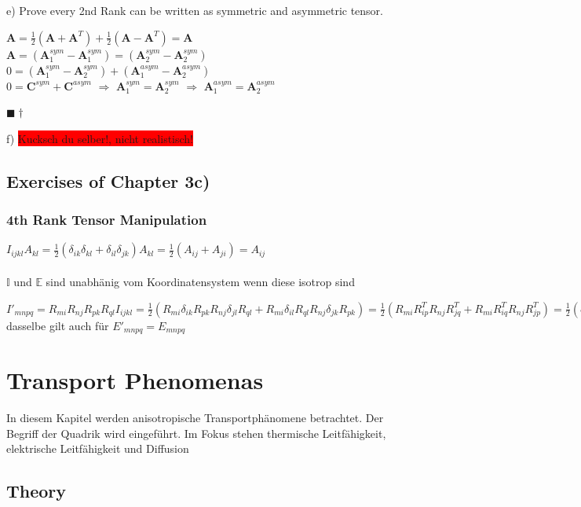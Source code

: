 \documentclass[a4paper]{scrartcl}
\newcommand{\qed}{\begin{flushright}
$\blacksquare \dagger$ \end{flushright}}
\begin{document}
e) Prove every 2nd Rank can be written as symmetric and asymmetric tensor.

$\mathbf{A}=\frac{1}{2}\left(\mathbf{A} + \mathbf{A}^T\right)+
\frac{1}{2}\left(\mathbf{A}-\mathbf{A}^T\right) = \mathbf{A}$ \\
$\mathbf{A}=\left(\mathbf{A}_1^{sym}-\mathbf{A}_1^{sym}\right)=\left(\mathbf{A}_2^{sym}-\mathbf{A}_2^{sym}\right)$
\\
$0=\left(\mathbf{A}_1^{sym}-\mathbf{A}_2^{sym}\right)+\left(\mathbf{A}_1^{asym}-\mathbf{A}_2^{asym}\right)$
\\
$0=\mathbf{C}^{sym}+\mathbf{C}^{asym}$ $\Rightarrow$
$\mathbf{A}_1^{sym}=\mathbf{A}_2^{sym}$ $\Rightarrow$
$\mathbf{A}_1^{asym}=\mathbf{A}_2^{asym}$ \qed


f) \colorbox{red}{Kucksch du selber!, nicht realistisch!}




\subsection{Exercises of Chapter 3c)}

\subsubsection{4th Rank Tensor Manipulation}


$I_{ijkl}A_{kl}=\frac{1}{2}(\delta_{ik}\delta_{kl}+\delta_{il}\delta_{jk})A_{kl}=\frac{1}{2}(A_{ij}+A_{ji})=A_{ij}$
\\
\\
$ \mathbb{I} $ und $ \mathbb{E} $ sind unabhänig vom Koordinatensystem wenn diese isotrop sind

$ I'_{mnpq}=R_{mi}R_{nj}R_{pk}R_{ql}I_{ijkl} = \frac{1}{2}(R_{mi}\delta_{ik}R_{pk}R_{nj}\delta_{jl}R_{ql} + R_{mi}\delta_{il}R_{ql}R_{nj}\delta_{jk}R_{pk})= \frac{1}{2}(R_{mi}R^T_{ip}R_{nj}R^T_{jq}+R_{mi}R^T_{iq}R_{nj}R^T_{jp})= \frac{1}{2}(\delta_{mp}\delta_{mq}\delta_{np})=I_{mnpq} $ dasselbe gilt auch für $ E'_{mnpq}=E_{mnpq}$



\section{Transport Phenomenas}
In diesem Kapitel werden anisotropische Transportphänomene betrachtet. Der
Begriff der Quadrik wird eingeführt. Im Fokus stehen thermische Leitfähigkeit,
elektrische Leitfähigkeit und Diffusion
\subsection{Theory}
\end{document}
